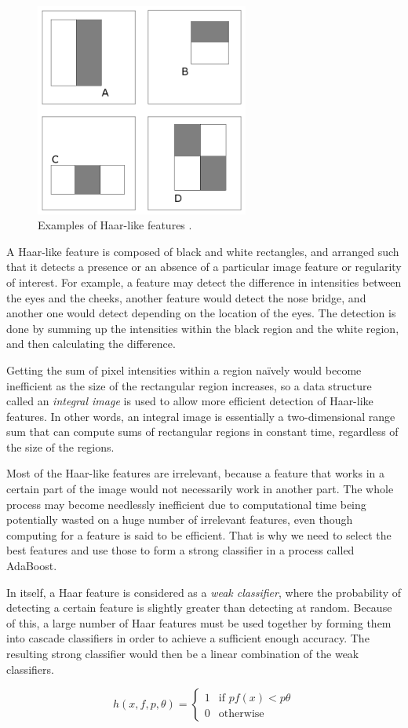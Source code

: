\begin{figure}[!h]
    \centering
    \includegraphics[width=7cm]{figures/haarfeatures2.png}
    \caption{Examples of Haar-like features \cite{viola_robust_2004}.}
\end{figure}

A Haar-like feature is composed of black and white rectangles, and arranged such that it detects a presence or an absence of a particular image feature or regularity of interest. For example, a feature may detect the difference in intensities between the eyes and the cheeks, another feature would detect the nose bridge, and another one would detect depending on the location of the eyes. The detection is done by summing up the intensities within the black region and the white region, and then calculating the difference.

Getting the sum of pixel intensities within a region na\"{i}vely would become inefficient as the size of the rectangular region increases, so a data structure called an \textit{integral image} is used to allow more efficient detection of Haar-like features. In other words, an integral image is essentially a two-dimensional range sum that can compute sums of rectangular regions in constant time, regardless of the size of the regions.

Most of the Haar-like features are irrelevant, because a feature that works in a certain part of the image would not necessarily work in another part. The whole process may become needlessly inefficient due to computational time being potentially wasted on a huge number of irrelevant features, even though computing for a feature is said to be efficient. That is why we need to select the best features and use those to form a strong classifier in a process called AdaBoost.

In itself, a Haar feature is considered as a \textit{weak classifier}, where the probability of detecting a certain feature is slightly greater than detecting at random. Because of this, a large number of Haar features must be used together by forming them into cascade classifiers in order to achieve a sufficient enough accuracy. The resulting strong classifier would then be a linear combination of the weak classifiers.



\[h \left(x, f, p, \theta \right) = \begin{cases}1 & \text{if } pf(x) < p\theta\\ 0 & \text{otherwise}\end{cases}
\]
